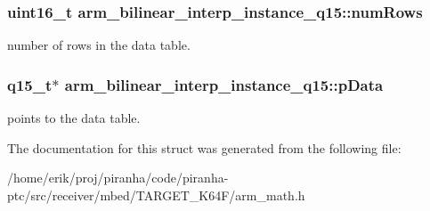 \subsubsection[{\texorpdfstring{num\+Rows}{numRows}}]{\setlength{\rightskip}{0pt plus 5cm}uint16\+\_\+t arm\+\_\+bilinear\+\_\+interp\+\_\+instance\+\_\+q15\+::num\+Rows}\hypertarget{structarm__bilinear__interp__instance__q15_a2130ae30a804995a9f5d0e2189e08565}{}\label{structarm__bilinear__interp__instance__q15_a2130ae30a804995a9f5d0e2189e08565}
number of rows in the data table. 
\subsubsection[{\texorpdfstring{p\+Data}{pData}}]{\setlength{\rightskip}{0pt plus 5cm}q15\+\_\+t$\ast$ arm\+\_\+bilinear\+\_\+interp\+\_\+instance\+\_\+q15\+::p\+Data}\hypertarget{structarm__bilinear__interp__instance__q15_a50d75b1316cee3e0dfad6dcc4c9a2954}{}\label{structarm__bilinear__interp__instance__q15_a50d75b1316cee3e0dfad6dcc4c9a2954}
points to the data table. 

The documentation for this struct was generated from the following file\+:\begin{DoxyCompactItemize}
\item 
/home/erik/proj/piranha/code/piranha-\/ptc/src/receiver/mbed/\+T\+A\+R\+G\+E\+T\+\_\+\+K64\+F/arm\+\_\+math.\+h\end{DoxyCompactItemize}
